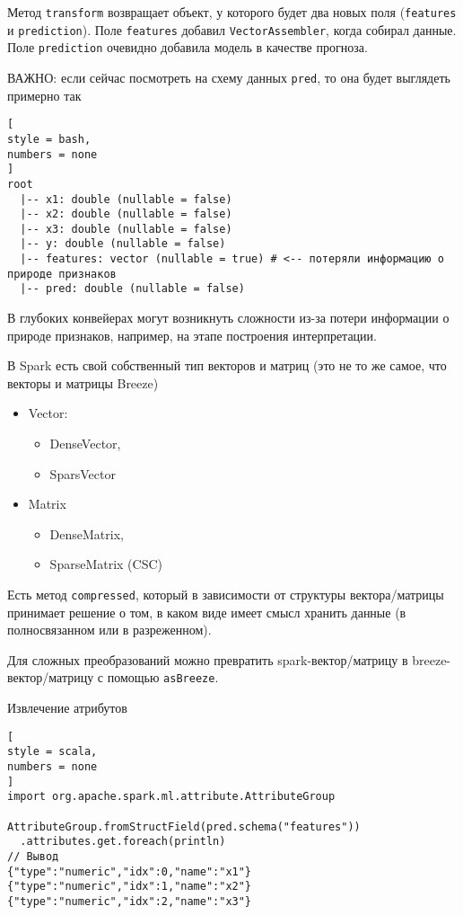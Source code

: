 \documentclass[%
	11pt,
	a4paper,
	utf8,
		]{article}
\begin{document}
Метод \texttt{transform} возвращает объект, у которого будет два новых поля (\texttt{features} и \texttt{prediction}). Поле \texttt{features} добавил \texttt{VectorAssembler}, когда собирал данные. Поле \texttt{prediction} очевидно добавила модель в качестве прогноза.

ВАЖНО: если сейчас посмотреть на схему данных \texttt{pred}, то она будет выглядеть примерно так
\begin{lstlisting}[
style = bash,
numbers = none
]
root
  |-- x1: double (nullable = false)
  |-- x2: double (nullable = false)
  |-- x3: double (nullable = false)
  |-- y: double (nullable = false)
  |-- features: vector (nullable = true) # <-- потеряли информацию о природе признаков
  |-- pred: double (nullable = false)
\end{lstlisting}

В глубоких конвейерах могут возникнуть сложности из-за потери информации о природе признаков, например, на этапе построения интерпретации. 

В Spark есть свой собственный тип векторов и матриц (это не то же самое, что векторы и матрицы Breeze)
\begin{itemize}
	\item Vector:
	\begin{itemize}
		\item DenseVector,
		
		\item SparsVector
	\end{itemize}

    \item Matrix
    \begin{itemize}
    	\item DenseMatrix,
    	
    	\item SparseMatrix (CSC)
    \end{itemize}
\end{itemize}

Есть метод \texttt{compressed}, который в зависимости от структуры вектора/матрицы принимает решение о том, в каком виде имеет смысл хранить данные (в полносвязанном или в разреженном).

Для сложных преобразований можно превратить spark-вектор/матрицу в breeze-вектор/матрицу с помощью \texttt{asBreeze}.

Извлечение атрибутов
\begin{lstlisting}[
style = scala,
numbers = none	
]
import org.apache.spark.ml.attribute.AttributeGroup

AttributeGroup.fromStructField(pred.schema("features"))
  .attributes.get.foreach(println)
// Вывод
{"type":"numeric","idx":0,"name":"x1"}
{"type":"numeric","idx":1,"name":"x2"}
{"type":"numeric","idx":2,"name":"x3"}
\end{lstlisting}
\end{document}

